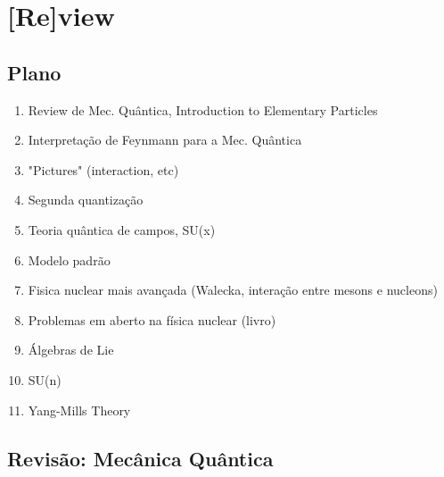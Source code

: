 \chapter{[Re]view}

\section{Plano}

\begin{enumerate}
\item Review de Mec. Quântica, Introduction to Elementary Particles
\item Interpretação de Feynmann para a Mec. Quântica
\item "Pictures" (interaction, etc)
\item Segunda quantização
\item Teoria quântica de campos, SU(x)
\item Modelo padrão
\item Fisica nuclear mais avançada (Walecka, interação entre mesons e nucleons)
\item Problemas em aberto na física nuclear (livro)
\item Álgebras de Lie
\item SU(n)
\item Yang-Mills Theory
\end{enumerate}

\section{Revisão: Mecânica Quântica}

